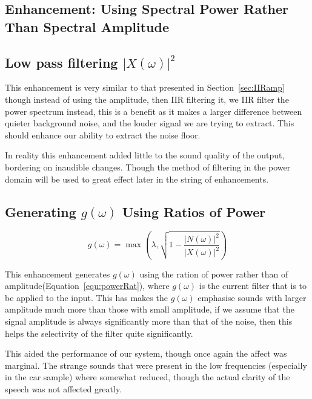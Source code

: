 \documentclass[11pt]{article} %
\begin{document}
\begin{raggedright}
\section{Enhancement: Using Spectral Power Rather Than Spectral Amplitude} 
\subsection{Low pass filtering $\lvert X(\omega) \rvert^{2} $} 

This enhancement is very similar to that presented in Section~\ref{sec:IIRamp} though instead of using the amplitude, then IIR filtering it, we IIR filter the power spectrum instead, this is a benefit as it makes a larger difference between quieter background noise, and the louder signal we are trying to extract. This should enhance our ability to extract the noise floor. 

In reality this enhancement added little to the sound quality of the output, bordering on inaudible changes. Though the method of filtering in the power domain will be used to great effect later in the string of enhancements.  

\subsection{Generating $g(\omega)$ Using Ratios of Power} 

\begin{equation}
\label{equ:powerRat}
	g(\omega) = \max\left(\lambda, \sqrt{1- \frac{\lvert N(\omega) \rvert ^{2}}{\lvert X(\omega) \rvert ^{2}}}\right)
\end{equation}

This enhancement generates $g(\omega)$ using the ration of power rather than of amplitude(Equation~\ref{equ:powerRat}), where $g(\omega)$ is the current filter that is to be applied to the input. This has makes the $g(\omega)$ emphasise sounds with larger amplitude much more than those with small amplitude, if we assume that the signal amplitude is always significantly more than that of the noise, then this helps the selectivity of the filter quite significantly. 

This aided the performance of our system, though once again the affect was marginal. The strange sounds that were present in the low frequencies (especially in the car sample) where somewhat reduced, though the actual clarity of the speech was not affected greatly.



\end{raggedright}
\end{document}
